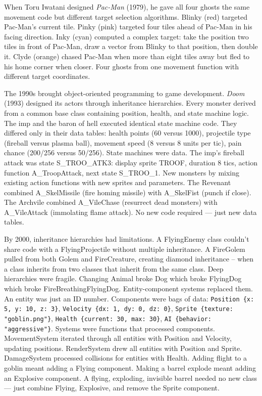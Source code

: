  When Toru Iwatani designed \emph{Pac-Man} (1979), he gave all four ghosts the same movement code but different target selection algorithms. Blinky (red) targeted Pac-Man's current tile. Pinky (pink) targeted four tiles ahead of Pac-Man in his facing direction. Inky (cyan) computed a complex target: take the position two tiles in front of Pac-Man, draw a vector from Blinky to that position, then double it. Clyde (orange) chased Pac-Man when more than eight tiles away but fled to his home corner when closer. Four ghosts from one movement function with different target coordinates.

The 1990s brought object-oriented programming to game development. \emph{Doom} (1993) designed its actors through inheritance hierarchies. Every monster derived from a common base class containing position, health, and state machine logic. The imp and the baron of hell executed identical state machine code. They differed only in their data tables: health points (60 versus 1000), projectile type (fireball versus plasma ball), movement speed (8 versus 8 units per tic), pain chance (200/256 versus 50/256). State machines were data. The imp's fireball attack was state S\_TROO\_ATK3: display sprite TROOF, duration 8 tics, action function A\_TroopAttack, next state S\_TROO\_1. New monsters by mixing existing action functions with new sprites and parameters. The Revenant combined A\_SkelMissile (fire homing missile) with A\_SkelFist (punch if close). The Archvile combined A\_VileChase (resurrect dead monsters) with A\_VileAttack (immolating flame attack). No new code required — just new data tables.

By 2000, inheritance hierarchies had limitations. A FlyingEnemy class couldn't share code with a FlyingProjectile without multiple inheritance. A FireGolem pulled from both Golem and FireCreature, creating diamond inheritance – when a class inherits from two classes that inherit from the same class. Deep hierarchies were fragile. Changing Animal broke Dog which broke FlyingDog which broke FireBreathingFlyingDog. Entity-component systems replaced them. An entity was just an ID number. Components were bags of data: \texttt{Position \{x: 5, y: 10, z: 3\}}, \texttt{Velocity \{dx: 1, dy: 0, dz: 0\}}, \texttt{Sprite \{texture: "goblin.png"\}}, \texttt{Health \{current: 30, max: 30\}}, \texttt{AI \{behavior: "aggressive"\}}. Systems were functions that processed components. MovementSystem iterated through all entities with Position and Velocity, updating positions. RenderSystem drew all entities with Position and Sprite. DamageSystem processed collisions for entities with Health. Adding flight to a goblin meant adding a Flying component. Making a barrel explode meant adding an Explosive component. A flying, exploding, invisible barrel needed no new class — just combine Flying, Explosive, and remove the Sprite component.


